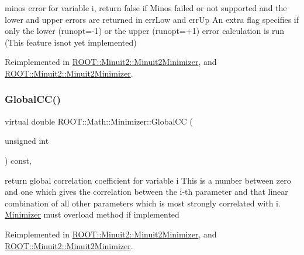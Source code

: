 minos error for variable i, return false if Minos failed or not supported and the lower and upper errors are returned in err\+Low and err\+Up An extra flag specifies if only the lower (runopt=-\/1) or the upper (runopt=+1) error calculation is run (This feature isnot yet implemented) 

Reimplemented in \mbox{\hyperlink{classROOT_1_1Minuit2_1_1Minuit2Minimizer_ab6c27c6f165821774dd304561e8956f5}{R\+O\+O\+T\+::\+Minuit2\+::\+Minuit2\+Minimizer}}, and \mbox{\hyperlink{classROOT_1_1Minuit2_1_1Minuit2Minimizer_ab6c27c6f165821774dd304561e8956f5}{R\+O\+O\+T\+::\+Minuit2\+::\+Minuit2\+Minimizer}}.

\mbox{\label{classROOT_1_1Math_1_1Minimizer_a6b50b0b0ccb0cb23da281ef978d145c5}} 
\subsubsection{\texorpdfstring{GlobalCC()}{GlobalCC()}\hspace{0.1cm}{\footnotesize\ttfamily [1/2]}}
{\footnotesize\ttfamily virtual double R\+O\+O\+T\+::\+Math\+::\+Minimizer\+::\+Global\+CC (\begin{DoxyParamCaption}\item[{unsigned int}]{ }\end{DoxyParamCaption}) const\hspace{0.3cm}{\ttfamily [inline]}, {\ttfamily [virtual]}}

return global correlation coefficient for variable i This is a number between zero and one which gives the correlation between the i-\/th parameter and that linear combination of all other parameters which is most strongly correlated with i. \mbox{\hyperlink{classROOT_1_1Math_1_1Minimizer}{Minimizer}} must overload method if implemented 

Reimplemented in \mbox{\hyperlink{classROOT_1_1Minuit2_1_1Minuit2Minimizer_adde21edb0a67e0eef950049528cfb9a7}{R\+O\+O\+T\+::\+Minuit2\+::\+Minuit2\+Minimizer}}, and \mbox{\hyperlink{classROOT_1_1Minuit2_1_1Minuit2Minimizer_adde21edb0a67e0eef950049528cfb9a7}{R\+O\+O\+T\+::\+Minuit2\+::\+Minuit2\+Minimizer}}.

\mbox{\label{classROOT_1_1Math_1_1Minimizer_a6b50b0b0ccb0cb23da281ef978d145c5}} 
